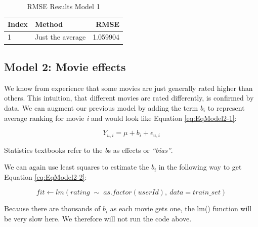 \documentclass[
]{article}
\begin{document}
\begin{table}[H]

\caption{\label{tab:m_1_4}RMSE Results Model 1\label{tbl:rmse_results_model_1}}
\centering
\fontsize{7}{9}\selectfont
\begin{tabular}[t]{llr}
\toprule
Index & Method & RMSE\\
\midrule
1 & Just the average & 1.059904\\
\bottomrule
\end{tabular}
\end{table}

\newpage

\hypertarget{model-2-movie-effects}{%
\subsection{Model 2: Movie effects}\label{model-2-movie-effects}}

We know from experience that some movies are just generally rated higher
than others. This intuition, that different movies are rated
differently, is confirmed by data. We can augment our previous model by
adding the term \(b_{i}\) to represent average ranking for movie
\emph{i} and would look like Equation \ref{eq:EqModel2-1}:

%
\par

\label{eq:EqModel2-1} \begin{equation}
  Y_{u,i} = \mu + b_{i} + \epsilon_{u,i}
\end{equation}

Statistics textbooks refer to the \emph{b}s as effects or
\emph{``bias''}.

We can again use least squares to estimate the \(b_{i}\) in the
following way to get Equation \ref{eq:EqModel2-2}:

%
\par

\label{eq:EqModel2-2} \begin{equation}
  fit \leftarrow lm(rating \; \sim \; as.factor(userId), \: data = train\_{}set)
\end{equation}

Because there are thousands of \(b_{i}\) as each movie gets one, the
lm() function will be very slow here. We therefore will not run the code
above.
\end{document}
